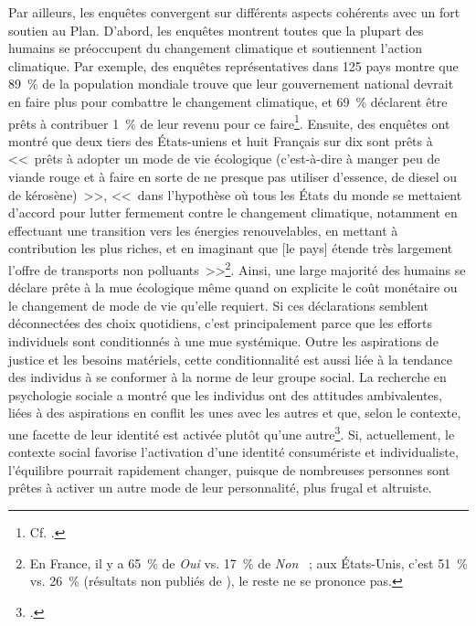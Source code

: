 \documentclass[a5paper,french,openany]{memoir}
\begin{document}
Par ailleurs, les enquêtes convergent sur différents aspects cohérents avec un fort soutien au Plan. D'abord, les enquêtes montrent toutes que la plupart des humains se préoccupent du changement climatique et soutiennent l'action climatique. Par exemple, des enquêtes représentatives dans 125 pays montre que 89~\% de la population mondiale trouve que leur gouvernement national devrait en faire plus pour combattre le changement climatique, et 69~\% déclarent être prêts à contribuer 1~\% de leur revenu pour ce faire\footnote{Cf. \cite{andre_actual_2024}.}. %
Ensuite, des enquêtes ont montré que deux tiers des États-uniens et huit Français sur dix sont prêts à <<~prêts à adopter un mode de vie écologique (c'est-à-dire à manger peu de viande rouge et à faire en sorte de ne presque pas utiliser d'essence, de diesel ou de
kérosène)~>>, <<~dans l'hypothèse où tous les États du monde se mettaient d'accord pour lutter fermement contre le changement climatique, notamment en effectuant une
transition vers les énergies renouvelables, en mettant à contribution les plus riches, et en imaginant que [le pays] étende très largement l'offre de transports non polluants~>>\footnote{En France, il y a 65~\% de \textit{Oui} vs. 17~\% de \textit{Non} \citep{douenne_french_2020}~; aux États-Unis, c'est 51~\% vs. 26~\% (résultats non publiés de \citealp{dechezlepretre_fighting_2022}), le reste ne se prononce pas.}. %
Ainsi, une large majorité des humains se déclare prête à la mue écologique même quand on explicite le coût monétaire ou le changement de mode de vie qu'elle requiert. 
Si ces déclarations semblent déconnectées des choix quotidiens, c'est principalement parce que les efforts individuels sont conditionnés à une mue systémique. Outre les aspirations de justice et les besoins matériels, cette conditionnalité est aussi liée à la tendance des individus à se conformer à la norme de leur groupe social. La recherche en psychologie sociale a montré que les individus ont des attitudes ambivalentes, liées à des aspirations en conflit les unes avec les autres et que, selon le contexte, une facette de leur identité est activée plutôt qu'une autre\footnote{\cite{fielding_social_2016,kim_normative_2012}.}. Si, actuellement, le contexte social favorise l'activation d'une identité consumériste et individualiste, l'équilibre pourrait rapidement changer, puisque de nombreuses personnes sont prêtes à activer un autre mode de leur personnalité, plus frugal et altruiste.
\end{document}
